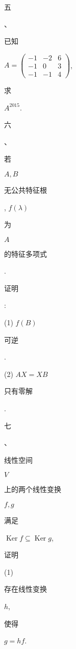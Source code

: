 \documentclass[10pt]{article}
\begin{document}
\begin{CJK}{UTF8}{mj}五\end{CJK}、\begin{CJK}{UTF8}{mj}已知\end{CJK} $A=\left(\begin{array}{ccc}-1 & -2 & 6 \\ -1 & 0 & 3 \\ -1 & -1 & 4\end{array}\right)$, \begin{CJK}{UTF8}{mj}求\end{CJK} $A^{2015}$.

\begin{CJK}{UTF8}{mj}六\end{CJK}、\begin{CJK}{UTF8}{mj}若\end{CJK} $A, B$ \begin{CJK}{UTF8}{mj}无公共特征根\end{CJK}, $f(\lambda)$ \begin{CJK}{UTF8}{mj}为\end{CJK} $A$ \begin{CJK}{UTF8}{mj}的特征多项式\end{CJK}. \begin{CJK}{UTF8}{mj}证明\end{CJK}:

(1) $f(B)$ \begin{CJK}{UTF8}{mj}可逆\end{CJK}.

(2) $A X=X B$ \begin{CJK}{UTF8}{mj}只有零解\end{CJK}.

\begin{CJK}{UTF8}{mj}七\end{CJK}、\begin{CJK}{UTF8}{mj}线性空间\end{CJK} $V$ \begin{CJK}{UTF8}{mj}上的两个线性变换\end{CJK} $f, g$ \begin{CJK}{UTF8}{mj}满足\end{CJK} $\operatorname{Ker} f \subseteq \operatorname{Ker} g$, \begin{CJK}{UTF8}{mj}证明\end{CJK}

(1) \begin{CJK}{UTF8}{mj}存在线性变换\end{CJK} $h$, \begin{CJK}{UTF8}{mj}使得\end{CJK} $g=h f$.
\end{document}

